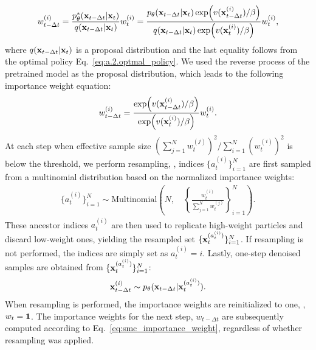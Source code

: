 \begin{align}
    \nonumber
    w_{t-\Delta t}^{(i)} =\frac{p^*_\theta(\mathbf{x}_{t-\Delta t}|\mathbf{x}_t)}{q(\mathbf{x}_{t-\Delta t}|\mathbf{x}_t)}w_t^{(i)} =\frac{p_\theta(\mathbf{x}_{t-\Delta t}|\mathbf{x}_t) \exp( v(\mathbf{x}^{(i)}_{t-\Delta t})/\beta)}{q(\mathbf{x}_{t-\Delta t}|\mathbf{x}_t) \exp (v(\mathbf{x}^{(i)}_{t})/\beta)}w_t^{(i)},
\end{align}
where $q(\mathbf{x}_{t-\Delta t}|\mathbf{x}_t)$ is a proposal distribution and the last equality follows from the optimal policy Eq.~\ref{eq:a.2.optmal_policy}. We used the reverse process of the pretrained model as the proposal distribution, which leads to the following importance weight equation:
\begin{align}
    \label{eq:smc_importance_weight}
    w_{t-\Delta t}^{(i)}=\frac{\exp( v(\mathbf{x}^{(i)}_{t-\Delta t})/\beta)}{\exp( v(\mathbf{x}^{(i)}_{t})/\beta)}w_t^{(i)}.
\end{align}
At each step when effective sample size $\left(\sum_{j=1}^N w_t^{(j)} \right)^2/\sum_{i=1}^N (w_t^{(i)})^2$ is below the threshold, we perform resampling, \ie, indices $\{ a_t^{(i)} \}_{i=1}^{N} $ are first sampled from a multinomial distribution based on the normalized importance weights:
\begin{align}
    \nonumber
    \{ a_t^{(i)} \}_{i=1}^{N} \sim \text{Multinomial} \left(N,\quad \left\{ \frac{w_t^{(i)}}{\sum_{j=1}^{N}w_t^{(j)}} \right\}_{i=1}^{N} \right).
\end{align}
These ancestor indices $a_t^{(i)}$ are then used to replicate high-weight particles and discard low-weight ones, yielding the resampled set $\{ \mathbf{x}_{t}^{ ( a_t^{(i)} ) } \}_{i=1}^N$. If resampling is not performed, the indices are simply set as $a_t^{(i)} = i$.
Lastly, one-step denoised samples are obtained from $\{\mathbf{x}_{t}^{ ( a_t^{(i)} ) } \}_{i=1}^N$:
\begin{align}
    \nonumber
    \mathbf{x}^{(i)}_{t-\Delta t}  \sim p_\theta(\mathbf{x}_{t-\Delta t} | \mathbf{x}_{t}^{ ( a_t^{(i)} ) } ).
\end{align}
When resampling is performed, the importance weights are reinitialized to one, \ie, $w_t=\mathbf{1}$. The importance weights for the next step, $w_{t-\Delta t}$ are subsequently computed according to Eq.~\ref{eq:smc_importance_weight}, regardless of whether resampling was applied.
